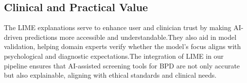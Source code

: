 \subsection{Clinical and Practical Value}
The LIME explanations serve to enhance user and clinician trust by making AI-driven predictions more accessible and understandable.They also aid in model validation, helping domain experts verify whether the model’s focus aligns with psychological and diagnostic expectations.The integration of LIME in our pipeline ensures that AI-assisted screening tools for BPD are not only accurate but also explainable, aligning with ethical standards and clinical needs.
